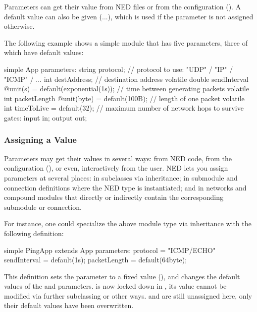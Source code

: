 Parameters can get their value from NED files or from the configuration
(). A default value can also be given (...\ttt{)}),
which is used if the parameter is not assigned otherwise.

The following example shows a simple module that has five parameters, three
of which have default values:

\begin{ned}
simple App
{
    parameters:
        string protocol;       // protocol to use: "UDP" / "IP" / "ICMP" / ...
        int destAddress;       // destination address
        volatile double sendInterval @unit(s) = default(exponential(1s));
                               // time between generating packets
        volatile int packetLength @unit(byte) = default(100B);
                               // length of one packet
        volatile int timeToLive = default(32);
                               // maximum number of network hops to survive
    gates:
        input in;
        output out;
}
\end{ned}


\subsubsection{Assigning a Value}

Parameters may get their values in several ways: from NED code, from the
configuration (), or even, interactively from the
user. NED lets you assign parameters at several places: in subclasses via
inheritance; in submodule and connection definitions where the NED type is
instantiated; and in networks and compound modules that directly or
indirectly contain the corresponding submodule or connection.

For instance, one could specialize the above  module type via
inheritance with the following definition:

\begin{ned}
simple PingApp extends App
{
    parameters:
        protocol = "ICMP/ECHO"
        sendInterval = default(1s);
        packetLength = default(64byte);
}
\end{ned}

This definition sets the  parameter to a fixed value
(), and changes the default values of the
 and  parameters.  is now
locked down in , its value cannot be modified via further subclassing
or other ways.  and  are still unassigned
here, only their default values have been overwritten.

